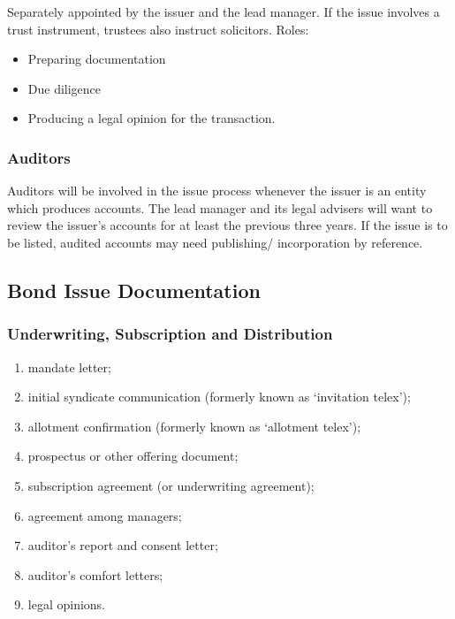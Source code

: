 \documentclass[
]{article}
\providecommand{\tightlist}{%
  \setlength{\itemsep}{0pt}\setlength{\parskip}{0pt}}
\begin{document}
Separately appointed by the issuer and the lead manager. If the issue
involves a trust instrument, trustees also instruct solicitors. Roles:

\begin{itemize}
\tightlist
\item
  Preparing documentation
\item
  Due diligence
\item
  Producing a legal opinion for the transaction.
\end{itemize}

\hypertarget{auditors}{%
\subsubsection{Auditors}\label{auditors}}

Auditors will be involved in the issue process whenever the issuer is an
entity which produces accounts. The lead manager and its legal advisers
will want to review the issuer's accounts for at least the previous
three years. If the issue is to be listed, audited accounts may need
publishing/ incorporation by reference.

\hypertarget{bond-issue-documentation}{%
\subsection{Bond Issue Documentation}\label{bond-issue-documentation}}

\hypertarget{underwriting-subscription-and-distribution}{%
\subsubsection{Underwriting, Subscription and
Distribution}\label{underwriting-subscription-and-distribution}}

\begin{enumerate}
\def\labelenumi{\arabic{enumi}.}
\tightlist
\item
  mandate letter;\\
\item
  initial syndicate communication (formerly known as `invitation
  telex');\\
\item
  allotment confirmation (formerly known as `allotment telex');\\
\item
  prospectus or other offering document;\\
\item
  subscription agreement (or underwriting agreement);\\
\item
  agreement among managers;\\
\item
  auditor's report and consent letter;\\
\item
  auditor's comfort letters;\\
\item
  legal opinions.
\end{enumerate}
\end{document}

